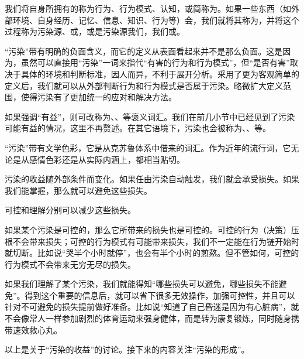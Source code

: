 \label{def:污染}我们将自身所拥有的称为行为、行为模式、认知，或简称为。如果一些东西（如外部环境、自身经历、记忆、信息、知识、行为等）会，我们就将其称为，并将这个过程称为污染源、或，或是污染源我们，我们或。
\begin{explain}
“污染”带有明确的负面含义，而它的定义从表面看起来并不是那么负面。这是因为，虽然可以直接用“污染”一词来指代“有害的行为和行为模式”，但“是否有害”取决于具体的环境和判断标准，因人而异，不利于展开分析。采用了更为客观简单的定义后，我们就可以从外部判断行为和行为模式是否属于污染。略微扩大定义范围，使得污染有了更加统一的应对和解决方法。

如果强调“有益”，则可改称为、、等褒义词汇。我们在前几小节中已经见到了污染可能有益的情况，这里不再赘述。在其它语境下，污染也会被称为、、等。

“污染”带有文学色彩，它是从克苏鲁体系中借来的词汇。作为近年的流行词，它无论是从感情色彩还是从实际内涵上，都相当贴切。
\end{explain}
污染的收益随外部条件而变化。如果任由污染自动触发，我们就会承受损失。如果我们能掌握，那么就可以避免这些损失。
\begin{explain}
可控和理解分别可以减少这些损失。

如果某个污染是可控的，那么它所带来的损失也是可控的。可控的行为（决策）压根不会带来损失；可控的行为模式有可能带来损失，我们不一定能在行为链开始时就切断。比如说“哭半个小时就停”，也会有半个小时的煎熬。但不管如何，可控的行为模式不会带来无穷无尽的损失。

如果我们理解了某个污染，我们就能得知“哪些损失可以避免，哪些损失不能避免”。得到这个重要的信息后，就可以省下很多无效操作，加强可控性，并且可以针对不可避免的损失提前做好准备。比如说“知道了自己昏迷是因为有心脏病”，就不会像常人一样参加剧烈的体育运动来强身健体，而是转为康复锻炼，同时随身携带速效救心丸。
\end{explain}
以上是关于“污染的收益”的讨论。接下来的内容关注“污染的形成”。\\
